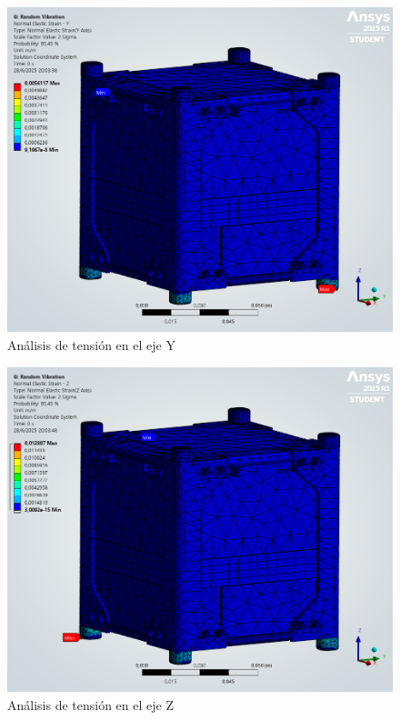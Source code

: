   \begin{figure}[H]
    \centering
    \includegraphics[width=14cm]{image/fem/ansys_cubesat-vibration_strain-y.png}
    \caption{Análisis de tensión en el eje Y}
  \end{figure}

  \begin{figure}[H]
    \centering
    \includegraphics[width=14cm]{image/fem/ansys_cubesat-vibration_strain-z.png}
    \caption{Análisis de tensión en el eje Z}
  \end{figure}

